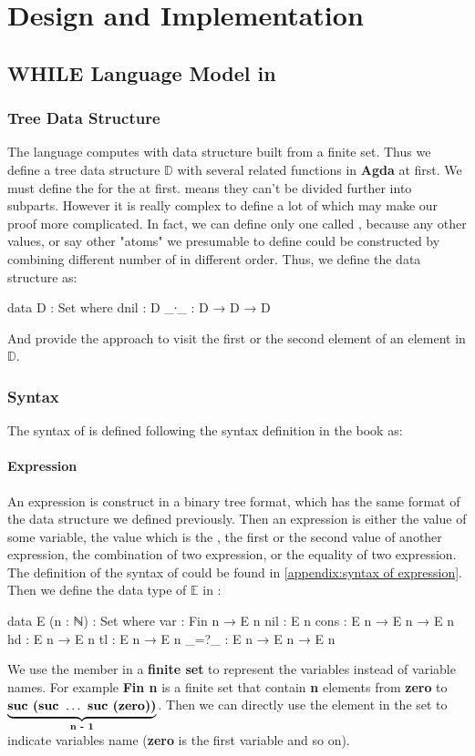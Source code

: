 \chapter{Design and Implementation}

\section{WHILE Language Model in \Agda}
\subsection{Tree Data Structure}
The language \WHILE computes with  data structure built from a finite set. 
Thus we define a tree data structure $\mathds{D}$ with several related functions in \textbf{Agda} at first.
We must define the  for the  at first.
 means they can't be divided further into subparts.
However it is really complex to define a lot of  which may make our proof more complicated.
In fact, we can define only one  called , because any other values, or say other "atoms" we presumable to define could be constructed by combining different number of  in different order.
Thus, we define the data structure as:
\begin{code}
data D : Set where
  dnil : D 
  _∙_  : D → D → D
\end{code}
And provide the approach to visit the first or the second element of an element in $\mathds{D}$.

\subsection{Syntax}
The syntax of \WHILE is defined following the syntax definition in the book\cite{jones_computability_1997} as:
\subsubsection{Expression}
An expression is construct in a binary tree format, which has the same format of the data structure we defined previously.
Then an expression is either the value of some variable, the  value which is the , the first or the second value of another expression, the combination of two expression, or the equality of two expression.
The definition of the syntax of  could be found in \ref{appendix:syntax of expression}.\\
Then we define the data type of $\mathds{E}$ in \Agda:
\begin{code}
data E (n : ℕ) : Set where
  var  : Fin n → E n
  nil  : E n
  cons : E n → E n → E n
  hd   : E n → E n
  tl   : E n → E n
  _=?_ : E n → E n → E n
\end{code}
We use the member in a \textbf{finite set} to represent the variables instead of variable names. 
For example \textbf{Fin n} is a finite set that contain \textbf{n} elements from \textbf{zero} to $\underbrace{\mbox{\textbf{suc (suc }} \dots \mbox{\textbf{ suc (zero))}}}_{\textbf{n - 1}}$.
Then we can directly use the element in the set to indicate variables name (\textbf{zero} is the first variable and so on).
